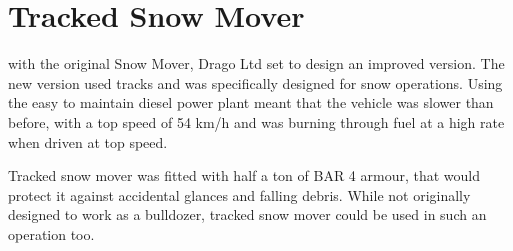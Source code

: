 \documentclass{tufte-book}
\begin{document}
\section{Tracked Snow Mover}
 with the original Snow Mover, Drago Ltd set to design an
improved version. The new version used tracks and was specifically
designed for snow operations. Using the easy to maintain diesel power
plant meant that the vehicle was slower than before, with a top speed
of 54 km/h and was burning through fuel at a high rate when driven at top
speed.

Tracked snow mover was fitted with half a ton of BAR 4 armour, that would
protect it against accidental glances and falling debris. While not
originally designed to work as a bulldozer, tracked snow mover could be used
in such an operation too.
\end{document}
